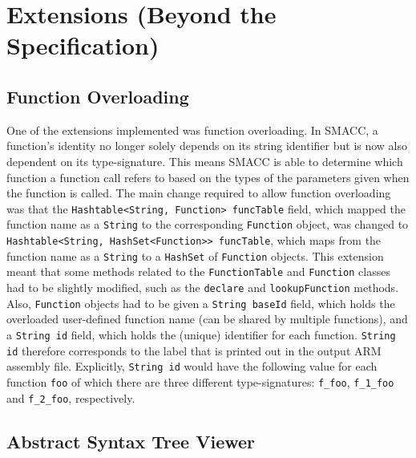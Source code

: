 \documentclass[a4wide, 10pt]{article}
\begin{document}
\section*{Extensions (Beyond the Specification)}

\subsection*{Function Overloading}

One of the extensions implemented was function overloading. In SMACC, a function's identity no longer solely depends on its string identifier but is now also dependent on its type-signature. This means SMACC is able to determine which function a function call refers to based on the types of the parameters given when the function is called. The main change required to allow function overloading was that the \texttt{Hashtable<String, Function> funcTable} field, which mapped the function name as a \texttt{String} to the corresponding \texttt{Function} object, was changed to \texttt{Hashtable<String, HashSet<Function>> funcTable}, which maps from the function name as a \texttt{String} to a \texttt{HashSet} of \texttt{Function} objects. This extension meant that some methods related to the \texttt{FunctionTable} and \texttt{Function} classes had to be slightly modified, such as the \texttt{declare} and \texttt{lookupFunction} methods. Also, \texttt{Function} objects had to be given a \texttt{String baseId} field, which holds the overloaded user-defined function name (can be shared by multiple functions), and a \texttt{String id} field, which holds the (unique) identifier for each function. \texttt{String id} therefore corresponds to the label that is printed out in the output ARM assembly file. Explicitly, \texttt{String id} would have the following value for each function \texttt{foo} of which there are three different type-signatures: \texttt{f\_foo}, \texttt{f\_1\_foo} and \texttt{f\_2\_foo}, respectively.

\subsection*{Abstract Syntax Tree Viewer}
\end{document}
